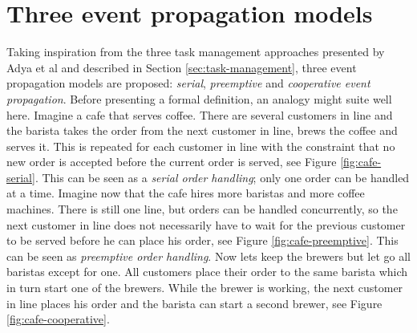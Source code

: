 \section{Three event propagation models}

Taking inspiration from the three task management approaches presented by Adya
et al \cite{adya2002cooperative} and described in Section
\ref{sec:task-management}, three event propagation models are proposed:
\textit{serial}, \textit{preemptive} and \textit{cooperative event
propagation}. Before presenting a formal definition, an analogy might suite
well here. Imagine a cafe that serves coffee. There are several customers in
line and the barista takes the order from the next customer in line, brews the
coffee and serves it. This is repeated for each customer in line with the
constraint that no new order is accepted before the current order is served,
see Figure \ref{fig:cafe-serial}. This can be seen as a \textit{serial order
handling}; only one order can be handled at a time. Imagine now that the cafe
hires more baristas and more coffee machines. There is still one line, but
orders can be handled concurrently, so the next customer in line does not
necessarily have to wait for the previous customer to be served before he can
place his order, see Figure \ref{fig:cafe-preemptive}. This can be seen as
\textit{preemptive order handling}. Now lets keep the brewers but let go all
baristas except for one. All customers place their order to the same barista
which in turn start one of the brewers. While the brewer is working, the next
customer in line places his order and the barista can start a second brewer,
see Figure \ref{fig:cafe-cooperative}.

